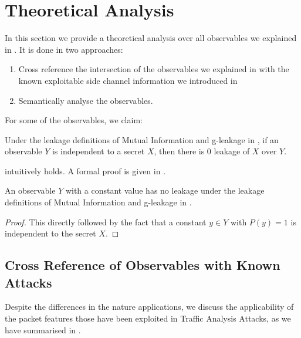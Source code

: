 \section{Theoretical Analysis}

In this section we provide a theoretical analysis over all observables we explained in . It is done in two approaches:

\begin{enumerate}
	\item Cross reference the intersection of the observables we explained in  with the known exploitable side channel information we introduced in 
	\item Semantically analyse the observables. 
\end{enumerate}


For some of the observables, we claim:

\begin{theorem} \label{Te: IR}
Under the leakage definitions of Mutual Information and g-leakage in , if an observable $Y$ is independent to a secret $X$, then there is $0$ leakage of $X$ over $Y$.
\end{theorem}

 intuitively holds. A formal proof is given in .

\begin{corollary} \label{Cor: Constant Leakage}
	An observable $Y$ with a constant value has no leakage under the leakage definitions of  Mutual Information and g-leakage in .
\end{corollary}

\begin{proof}
	This directly followed by the fact that a constant $y \in Y$ with $P(y) = 1$ is independent to the secret $X$.
\end{proof}

\subsection{Cross Reference of Observables with Known Attacks} \label{Subsec: Cross Reference}

Despite the differences in the nature applications, we discuss the applicability of the packet features those have been exploited in Traffic Analysis Attacks, as we have summarised in .

